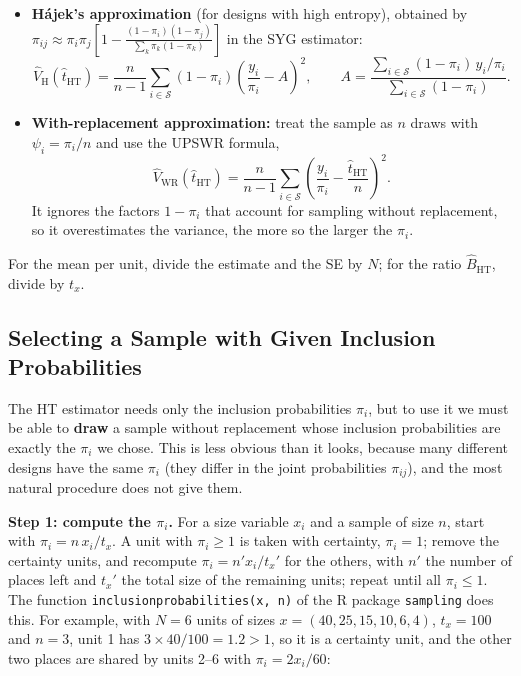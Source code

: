 \documentclass[
  letterpaper,
  DIV=11,
  numbers=noendperiod]{scrreprt}
\renewcommand{\[}{\begin{equation}}
\renewcommand{\]}{\end{equation}}
\begin{document}
\begin{itemize}
\item
  \textbf{Hájek's approximation} (for designs with high entropy),
  obtained by
  \(\pi_{ij}\approx\pi_i\pi_j\left[1-\frac{(1-\pi_i)(1-\pi_j)}{\sum_k\pi_k(1-\pi_k)}\right]\)
  in the SYG estimator: \[
  \hat{V}_{\mathrm{H}}(\hat{t}_{\mathrm{HT}})=\frac{n}{n-1}\sum_{i\in\mathcal{S}}(1-\pi_i)
  \left(\frac{y_i}{\pi_i}-A\right)^2,\qquad
  A=\frac{\sum_{i\in\mathcal{S}}(1-\pi_i)\,y_i/\pi_i}{\sum_{i\in\mathcal{S}}(1-\pi_i)} .
  \]
\item
  \textbf{With-replacement approximation:} treat the sample as \(n\)
  draws with \(\psi_i=\pi_i/n\) and use the UPSWR formula, \[
  \hat{V}_{\mathrm{WR}}(\hat{t}_{\mathrm{HT}})=\frac{n}{n-1}\sum_{i\in\mathcal{S}}\left(\frac{y_i}{\pi_i}-\frac{\hat{t}_{\mathrm{HT}}}{n}\right)^2 .
  \] It ignores the factors \(1-\pi_i\) that account for sampling
  without replacement, so it overestimates the variance, the more so the
  larger the \(\pi_i\).
\end{itemize}

For the mean per unit, divide the estimate and the SE by \(N\); for the
ratio \(\hat{B}_{\mathrm{HT}}\), divide by \(t_x\).

\subsection{Selecting a Sample with Given Inclusion
Probabilities}\label{sec-ups-wo-select}

The HT estimator needs only the inclusion probabilities \(\pi_i\), but
to use it we must be able to \textbf{draw} a sample without replacement
whose inclusion probabilities are exactly the \(\pi_i\) we chose. This
is less obvious than it looks, because many different designs have the
same \(\pi_i\) (they differ in the joint probabilities \(\pi_{ij}\)),
and the most natural procedure does not give them.

\textbf{Step 1: compute the \(\pi_i\).} For a size variable \(x_i\) and
a sample of size \(n\), start with \(\pi_i=n\,x_i/t_x\). A unit with
\(\pi_i\ge 1\) is taken with certainty, \(\pi_i=1\); remove the
certainty units, and recompute \(\pi_i=n'x_i/t_x'\) for the others, with
\(n'\) the number of places left and \(t_x'\) the total size of the
remaining units; repeat until all \(\pi_i\le1\). The function
\texttt{inclusionprobabilities(x,\ n)} of the R package
\texttt{sampling} does this. For example, with \(N=6\) units of sizes
\(x=(40,25,15,10,6,4)\), \(t_x=100\) and \(n=3\), unit 1 has
\(3\times40/100=1.2>1\), so it is a certainty unit, and the other two
places are shared by units 2--6 with \(\pi_i=2x_i/60\):
\end{document}
